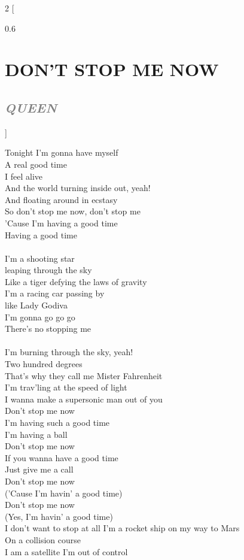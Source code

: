 \documentclass[100pt,a4paper]{report}
\newenvironment{song2}[2]
	{	
    	\begin{multicols*}{2}
		[
			\begin{spacing}{0.6}
				\section*{\LARGE\centering \MakeUppercase{\textbf{{#1}}}}
				\subsection*{\Large\centering \textit{\textcolor{gray}{\MakeUppercase{{#2}}}}}
			\end{spacing}
		]
		\Large
	}
	{
	\end{multicols*}
	\newpage
    }
\begin{document}
\begin{song2}{Don't stop me now}{Queen}
\noindent
Tonight I'm gonna have myself\\
A real good time\\
I feel alive\\ 
And the world turning inside out, yeah!\\
And floating around in ecstasy\\
So don't stop me now, don't stop me\\
'Cause I'm having a good time\\ 
Having a good time\\
\\
I'm a shooting star\\ 
leaping through the sky\\
Like a tiger defying the laws of gravity\\
I'm a racing car passing by\\ 
like Lady Godiva\\
I'm gonna go go go\\
There's no stopping me\\
\\
I'm burning through the sky, yeah!\\
Two hundred degrees\\
That's why they call me Mister Fahrenheit\\
I'm trav'ling at the speed of light\\
I wanna make a supersonic man out of you\\
Don't stop me now\\ 
I'm having such a good time\\
I'm having a ball\\ 
Don't stop me now\\
If you wanna have a good time\\ 
Just give me a call\\
Don't stop me now\\ 
('Cause I'm havin' a good time)\\
Don't stop me now\\ 
(Yes, I'm havin' a good time)\\
I don't want to stop at all
\vfill
\columnbreak
\noindent
I'm a rocket ship on my way to Mars\\
On a collision course\\
I am a satellite I'm out of control\\

\end{song2}
\end{document}
